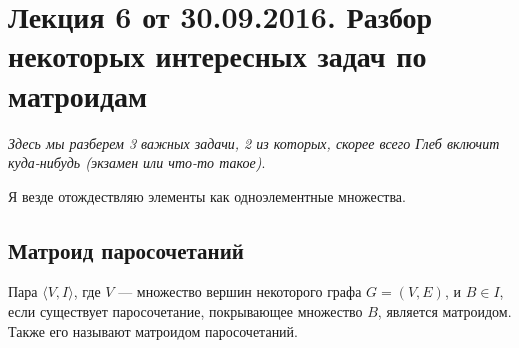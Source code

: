 \documentclass[a4paper, 12pt]{article}
\begin{document}
\pagestyle{fancy}

\section{Лекция 6 от 30.09.2016. Разбор некоторых интересных
задач по матроидам}

\textit{Здесь мы разберем 3 важных задачи, 2 из которых, скорее всего Глеб включит
куда-нибудь (экзамен или что-то такое)}.

Я везде отождествляю элементы как одноэлементные множества.

\subsection{Матроид паросочетаний}

\begin{Lemma}
  Пара $\langle V, I\rangle$, где $V$ --- множество вершин
  некоторого графа $G = (V, E)$, и $B \in I$, если существует
  паросочетание, покрывающее множество $B$, является матроидом. Также его называют
  матроидом паросочетаний.
\end{Lemma}
\end{document}
